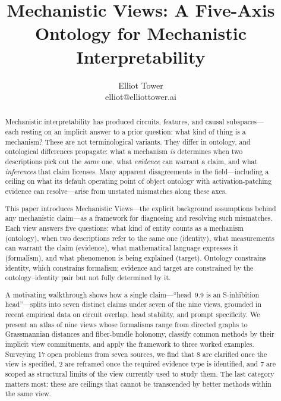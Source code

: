 \documentclass{article}
\title{Mechanistic Views: A Five-Axis Ontology for Mechanistic Interpretability}
\author{\name Elliot Tower \\
      \email elliot@elliottower.ai}
\begin{document}
\maketitle

\begin{abstract}
Mechanistic interpretability has produced circuits, features, and causal
subspaces---each resting on an implicit answer to a prior question:
what kind of thing is a mechanism?
These are not terminological variants.  They differ in ontology, and
ontological differences propagate: what a mechanism \emph{is} determines
when two descriptions pick out the \emph{same} one, what \emph{evidence}
can warrant a claim, and what \emph{inferences} that claim licenses.
Many apparent disagreements in the field---including a ceiling on what
its default operating point of object ontology with activation-patching
evidence can resolve---arise from unstated mismatches along these axes.

This paper introduces Mechanistic Views---the explicit
background assumptions behind any mechanistic claim---as a framework
for diagnosing and resolving such mismatches.  Each view answers five
questions: what kind of entity counts as a mechanism (ontology), when
two descriptions refer to the same one (identity), what measurements
can warrant the claim (evidence), what mathematical language expresses
it (formalism), and what phenomenon is being explained (target).
Ontology constrains identity, which constrains formalism; evidence and
target are constrained by the ontology--identity pair but not fully
determined by it.

A motivating walkthrough shows how a single claim---``head~9.9
is an S-inhibition head''---splits into seven distinct claims under
seven of the nine views, grounded in recent empirical data on circuit
overlap,
head stability, and prompt specificity.
We present an atlas of nine views whose formalisms range from directed
graphs to Grassmannian distances and fiber-bundle holonomy, classify
common methods by their implicit view commitments, and apply the
framework to three worked examples.  Surveying 17 open problems from
seven sources, we find that 8 are clarified once the view is specified,
2 are reframed once the required evidence type is identified, and 7 are
scoped as structural limits of the view currently used to study them.
The last category matters most: these are ceilings that cannot be
transcended by better methods within the same view.
\end{abstract}
\end{document}

